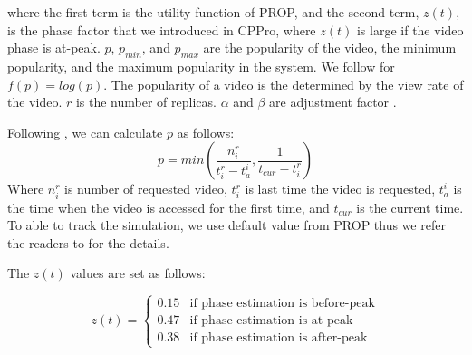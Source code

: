 \documentclass[10pt,final,journal,a4paper]{IEEEtran}
\begin{document}
where the first term is the utility function of PROP, and the second term, $z(t)$, is the phase factor that we introduced in CPPro, where $z(t)$ is large if the video phase is at-peak.
$p$, $p_{min}$, and $p_{max}$ are the popularity of the video, the minimum popularity, and the maximum popularity in the system.
We follow \cite{1613869} for $f(p) = log(p)$.
The popularity of a video is the determined by the view rate of the video.
$r$ is the number of replicas. 
$\alpha$ and $\beta$ are adjustment factor \cite{1613869}.

Following \cite{1613869}, we can calculate $p$ as follows:
\begin{equation}
p = min \left(\frac{n_i^r}{t_i^r - t_a^i}  , \frac{1}{t_{cur} - t_i^r}\right)
\end{equation}
Where $n_i^r$ is number of requested video, $t_i^r$ is last time the video is requested, $t_a^i$ is the time when the video is accessed for the first time, and $t_{cur}$ is the current time.
To able to track the simulation, we use default value from PROP thus we refer the readers to \cite{1613869} for the details.

The $z(t)$ values are set as follows:

\begin{equation}
 z(t) = 
  \begin{cases}
   0.15 & \text{if phase estimation is before-peak} \\
   0.47 & \text{if phase estimation is at-peak} \\
   0.38 & \text{if phase estimation is after-peak}
  \end{cases}
\end{equation}\label{eq:zfactor}
\end{document}
